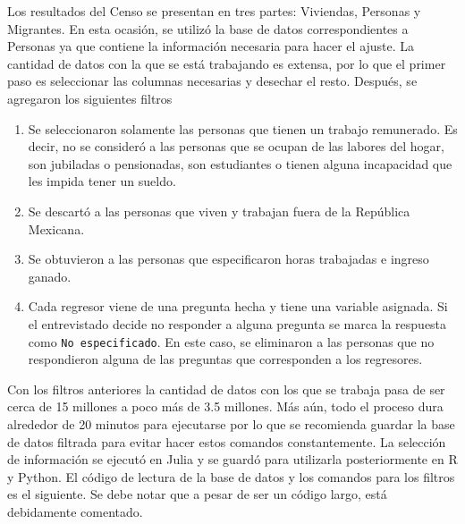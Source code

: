 Los resultados del Censo se presentan en tres partes: Viviendas, Personas y Migrantes. En esta ocasión, se utilizó la base de datos correspondientes a Personas ya que contiene la información necesaria para hacer el ajuste. La cantidad de datos con la que se está trabajando es extensa, por lo que el primer paso es seleccionar las columnas necesarias y desechar el resto. Después, se agregaron los siguientes filtros 

\begin{enumerate}
    \item Se seleccionaron solamente las personas que tienen un trabajo remunerado. Es decir, no se consideró a las personas que
    se ocupan de las labores del hogar, son jubiladas o pensionadas, son estudiantes o tienen alguna incapacidad que les impida tener un sueldo. 
    
    \item Se descartó a las personas que viven y trabajan fuera de la República Mexicana. 
    
    \item Se obtuvieron a las personas que especificaron horas trabajadas e ingreso ganado.
    
    \item Cada regresor viene de una pregunta hecha y tiene una variable asignada. Si el entrevistado decide no responder a alguna pregunta se marca la respuesta como \texttt{No especificado}. En este caso, se eliminaron a las personas que no respondieron alguna de las preguntas que corresponden a los regresores. 
\end{enumerate}

Con los filtros anteriores la cantidad de datos con los que se trabaja pasa de ser cerca de 15 millones a poco más de 3.5 millones. Más aún, todo el proceso dura alrededor de 20 minutos para ejecutarse por lo que se recomienda guardar la base de datos filtrada para evitar hacer estos comandos constantemente. La selección de información se ejecutó en \textsf{Julia} y se guardó para utilizarla posteriormente en \textsf{R} y \textsf{Python}. El código de lectura de la base de datos y los comandos para los filtros es el siguiente. Se debe notar que a pesar de ser un código largo, está debidamente comentado. 


